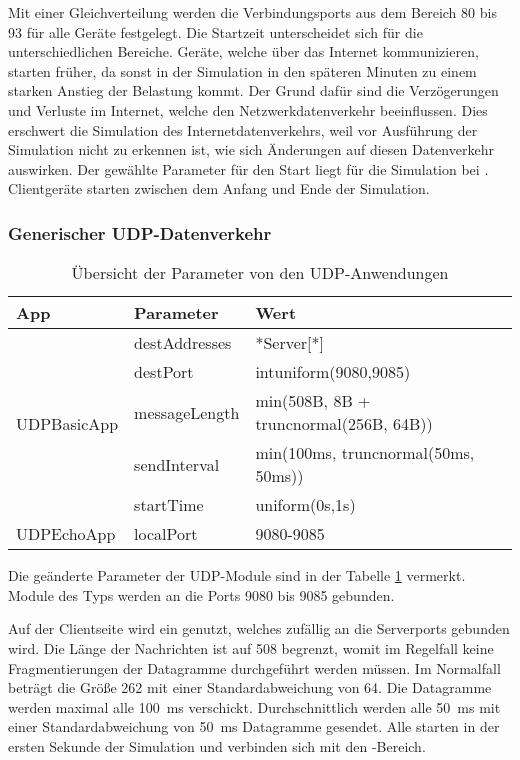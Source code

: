 Mit einer Gleichverteilung werden die Verbindungsports aus dem Bereich 80 bis 93 für alle Geräte festgelegt. Die Startzeit unterscheidet sich für die unterschiedlichen Bereiche. Geräte, welche über das Internet kommunizieren, starten früher, da sonst in der Simulation in den späteren Minuten zu einem starken Anstieg der Belastung kommt. Der Grund dafür sind die Verzögerungen und Verluste im Internet, welche den Netzwerkdatenverkehr beeinflussen. Dies erschwert die Simulation des Internetdatenverkehrs, weil vor Ausführung der Simulation nicht zu erkennen ist, wie sich Änderungen auf diesen Datenverkehr auswirken. Der gewählte Parameter für den Start liegt für die Simulation bei . Clientgeräte starten zwischen dem Anfang und Ende der Simulation.


\subsubsection{Generischer UDP-Datenverkehr}
\begin{table}[ht]
	\centering
	\begin{tabularx}{\textwidth}{|l|X|X|}
		\hline
		\rowcolor{Gainsboro!60}
		App                          & Parameter     & Wert                                   \\ \hline
		\multirow{5}{*}{UDPBasicApp} & destAddresses & *Server{[}*{]}                         \\ \cline{2-3}
		& destPort      & intuniform(9080,9085)                  \\ \cline{2-3}
		& messageLength & min(508B, 8B + truncnormal(256B, 64B)) \\ \cline{2-3}
		& sendInterval  & min(100ms, truncnormal(50ms, 50ms))   \\ \cline{2-3}
		& startTime     & uniform(0s,1s)                         \\ \hline
		\multirow{1}{*}{UDPEchoApp}  & localPort     & 9080-9085                              \\ \hline
	\end{tabularx}
	\caption{Übersicht der Parameter von den UDP-Anwendungen}
	\label{tab:udpModule}
\end{table}
Die geänderte Parameter der UDP-Module sind in der Tabelle \ref{tab:udpModule} vermerkt. Module des Typs  werden an die Ports 9080 bis 9085 gebunden. 

Auf der Clientseite wird ein  genutzt, welches zufällig an die Serverports gebunden wird. Die Länge der Nachrichten ist auf \SI{508}{\byte} begrenzt, womit im Regelfall keine Fragmentierungen der Datagramme durchgeführt werden müssen. Im Normalfall beträgt die Größe \SI{262}{\byte} mit einer Standardabweichung von \SI{64}{\byte}. Die Datagramme werden maximal alle \SI{100}{\milli\second} verschickt. Durchschnittlich werden alle \SI{50}{\milli\second} mit einer Standardabweichung von \SI{50}{\milli\second} Datagramme gesendet. Alle  starten in der ersten Sekunde der Simulation und verbinden sich mit den -Bereich.

